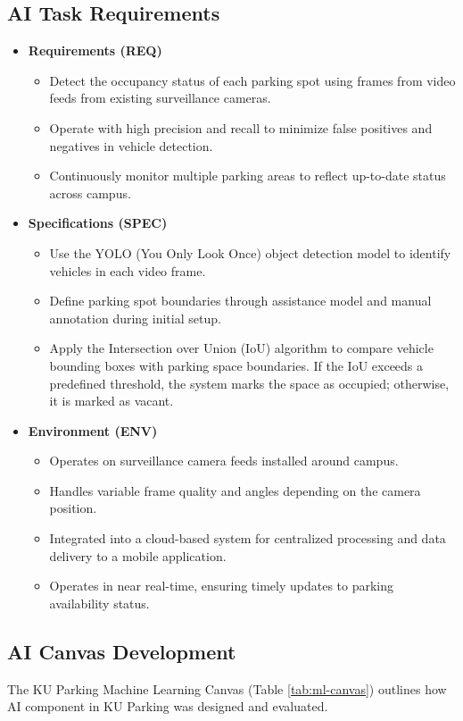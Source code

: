 \subsection{AI Task Requirements}
\label{subsection:ai-task-requirement}
\begin{itemize}
  \item \textbf{Requirements (REQ)}
  \begin{itemize}
    \item Detect the occupancy status of each parking spot using frames from video feeds from existing surveillance cameras.
    \item Operate with high precision and recall to minimize false positives and negatives in vehicle detection.
    \item Continuously monitor multiple parking areas to reflect up-to-date status across campus.
  \end{itemize}
  \item \textbf{Specifications (SPEC)}
  \begin{itemize}
    \item Use the YOLO (You Only Look Once) object detection model to identify vehicles in each video frame.
    \item Define parking spot boundaries through assistance model and manual annotation during initial setup.
    \item Apply the Intersection over Union (IoU) algorithm to compare vehicle bounding boxes with parking space boundaries. If the IoU exceeds a predefined threshold, the system marks the space as occupied; otherwise, it is marked as vacant.
  \end{itemize}
  \item \textbf{Environment (ENV)}
  \begin{itemize}
    \item Operates on surveillance camera feeds installed around campus.
    \item Handles variable frame quality and angles depending on the camera position.
    \item Integrated into a cloud-based system for centralized processing and data delivery to a mobile application.
    \item Operates in near real-time, ensuring timely updates to parking availability status.
  \end{itemize}
\end{itemize}


\subsection{AI Canvas Development}
\label{subsection:ai-canvas-development}
The KU Parking Machine Learning Canvas (Table \ref{tab:ml-canvas}) outlines how AI component in KU Parking was designed and evaluated.

